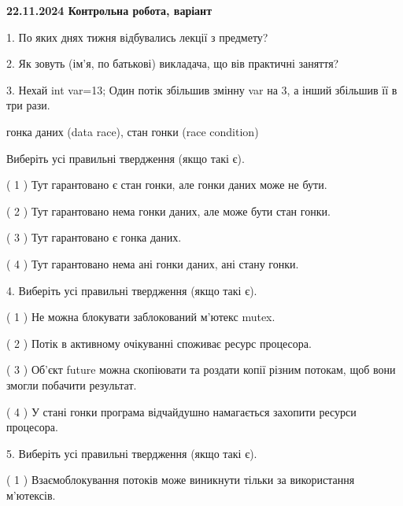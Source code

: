 \documentclass[12pt, ukrainian]{article}
\begin{document}
\vspace{4mm}
\newpage
\begin {large}

\textbf{22.11.2024 Контрольна робота, варіант  }\par


{
1. По яких днях тижня відбувались лекції з предмету?



\vspace{5mm}
2. Як зовуть (ім'я, по батькові) викладача, що вів практичні заняття?



\vspace{5mm}
3. Нехай int var=13; Один потік збільшив змінну var на 3, а інший збільшив її в три рази.

гонка даних (data race), стан гонки (race condition)

Виберіть усі правильні твердження (якщо такі є).\par
\vspace{2mm}
( 1 ) Тут гарантовано є стан гонки, але гонки даних може не бути.%

( 2 ) Тут гарантовано нема гонки даних, але може бути стан гонки.%

( 3 ) Тут гарантовано є гонка даних.%

( 4 ) Тут гарантовано нема ані гонки даних, ані стану гонки.%


\vspace{5mm}
4. Виберіть усі правильні твердження (якщо такі є).\par
\vspace{2mm}

( 1 ) Не можна блокувати заблокований м’ютекс mutex.%

( 2 ) Потік в активному очікуванні споживає ресурс процесора.%

( 3 ) Об’єкт future можна скопіювати та роздати копії різним потокам, щоб вони змогли побачити результат.%

( 4 ) У стані гонки програма відчайдушно намагається захопити ресурси процесора.%


\vspace{5mm}
5. Виберіть усі правильні твердження (якщо такі є).\par
\vspace{2mm}

( 1 ) Взаємоблокування потоків може виникнути тільки за використання м’ютексів.%

}
\end{large}
\end{document}
